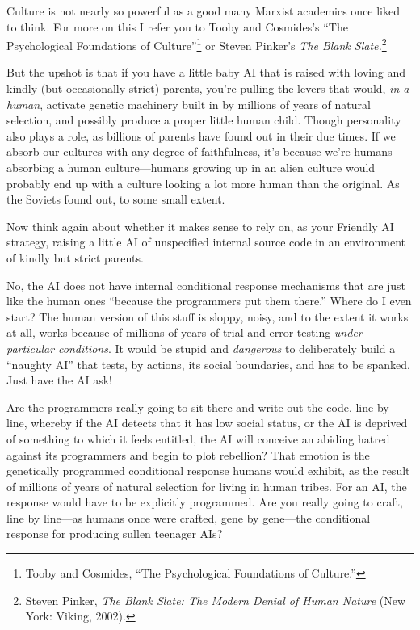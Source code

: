{
 Culture is not nearly so powerful as a good many Marxist academics
once liked to think. For more on this I refer you to Tooby and
Cosmides's ``The Psychological
Foundations of Culture''\footnote{Tooby and Cosmides, ``The Psychological
Foundations of Culture.''} or Steven
Pinker's \textit{The Blank Slate.}\footnote{Steven Pinker, \textit{The Blank Slate: The Modern Denial of
Human Nature} (New York: Viking, 2002).}}

{
 But the upshot is that if you have a little baby AI that is raised
with loving and kindly (but occasionally strict) parents,
you're pulling the levers that would, \textit{in a
human}, activate genetic machinery built in by millions of years of
natural selection, and possibly produce a proper little human child.
Though personality also plays a role, as billions of parents have found
out in their due times. If we absorb our cultures with any degree of
faithfulness, it's because we're humans
absorbing a human culture---humans growing up in an alien culture would
probably end up with a culture looking a lot more human than the
original. As the Soviets found out, to some small extent.}

{
 Now think again about whether it makes sense to rely on, as your
Friendly AI strategy, raising a little AI of unspecified internal
source code in an environment of kindly but strict parents.}

{
 No, the AI does not have internal conditional response mechanisms
that are just like the human ones ``because the
programmers put them there.'' Where do I even start?
The human version of this stuff is sloppy, noisy, and to the extent it
works at all, works because of millions of years of trial-and-error
testing \textit{under particular conditions}. It would be stupid and
\textit{dangerous} to deliberately build a ``naughty
AI'' that tests, by actions, its social boundaries,
and has to be spanked. Just have the AI ask!}

{
 Are the programmers really going to sit there and write out the
code, line by line, whereby if the AI detects that it has low social
status, or the AI is deprived of something to which it feels entitled,
the AI will conceive an abiding hatred against its programmers and
begin to plot rebellion? That emotion is the genetically programmed
conditional response humans would exhibit, as the result of millions of
years of natural selection for living in human tribes. For an AI, the
response would have to be explicitly programmed. Are you really going
to craft, line by line---as humans once were crafted, gene by
gene---the conditional response for producing sullen teenager AIs?}

